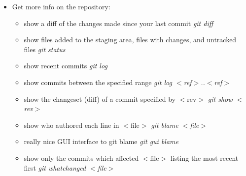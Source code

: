 \begin{itemize}
\item Get more info on the repository:
   \begin{itemize}
          \item show a diff of the changes made since your last commit \textit{git diff}
	  \item show files added to the staging area, files with changes, and untracked files \textit{git status}
	  \item show recent commits \textit{git log}
	  \item show commits between the specified range \textit{git log $<$ref$>$..$<$ref$>$}
	  \item show the changeset (diff) of a commit specified by $<$rev$>$ \textit{git show $<$rev$>$}
	  \item show who authored each line in $<$file$>$ \textit{ git blame $<$file$>$ }
	  \item really nice GUI interface to git blame \textit{ git gui blame}
	  \item show only the commits which affected $<$file$>$ listing the most recent first \textit{git whatchanged $<$file$>$}
   \end{itemize}     


\end{itemize}
